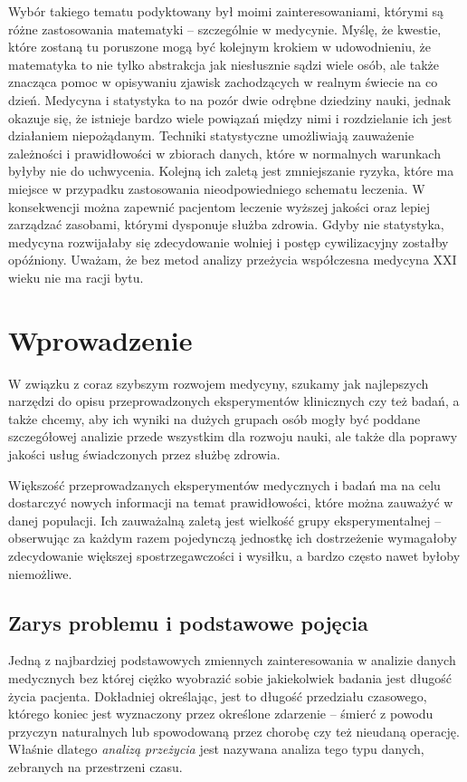 \documentclass[licencjacka]{pwr_wmat_praca_dyplomowa}
\theoremstyle{plain}
\numberwithin{theorem}{chapter}
\theoremstyle{definition}
\numberwithin{theorem}{chapter}
\begin{document}
Wybór takiego tematu podyktowany był moimi zainteresowaniami, którymi są różne zastosowania matematyki -- szczególnie w medycynie. Myślę, że kwestie, które zostaną tu poruszone mogą być kolejnym krokiem w udowodnieniu, że matematyka to nie tylko abstrakcja jak niesłusznie sądzi wiele osób, ale także znacząca pomoc w opisywaniu zjawisk zachodzących w realnym świecie na co dzień. Medycyna i statystyka to na pozór dwie odrębne dziedziny nauki, jednak okazuje się, że istnieje bardzo wiele powiązań między nimi i rozdzielanie ich jest działaniem niepożądanym. Techniki statystyczne umożliwiają zauważenie zależności i prawidłowości w zbiorach danych, które w normalnych warunkach byłyby nie do uchwycenia. Kolejną ich zaletą jest zmniejszanie ryzyka, które ma miejsce w przypadku zastosowania nieodpowiedniego schematu leczenia. W konsekwencji można zapewnić pacjentom leczenie wyższej jakości oraz lepiej zarządzać zasobami, którymi dysponuje służba zdrowia. Gdyby nie statystyka, medycyna rozwijałaby się zdecydowanie wolniej i postęp cywilizacyjny zostałby opóźniony. Uważam, że bez metod analizy przeżycia współczesna medycyna XXI wieku nie ma racji bytu.



\chapter{Wprowadzenie} 


W związku z coraz szybszym rozwojem medycyny, szukamy jak najlepszych narzędzi do opisu przeprowadzonych eksperymentów klinicznych czy też badań, a także chcemy, aby ich wyniki na dużych grupach osób mogły być poddane szczegółowej analizie przede wszystkim dla rozwoju nauki, ale także dla poprawy jakości usług świadczonych przez służbę zdrowia. 

Większość przeprowadzanych eksperymentów medycznych i badań ma na celu dostarczyć nowych informacji na temat  prawidłowości, które można zauważyć w danej populacji. Ich zauważalną zaletą jest wielkość grupy eksperymentalnej -- obserwując za każdym razem pojedynczą jednostkę ich dostrzeżenie wymagałoby zdecydowanie większej spostrzegawczości i wysiłku, a bardzo często nawet byłoby niemożliwe. 

\section{Zarys problemu i podstawowe pojęcia}

Jedną z najbardziej podstawowych zmiennych zainteresowania w analizie danych medycznych bez której ciężko wyobrazić sobie jakiekolwiek badania jest długość życia pacjenta. Dokładniej określając, jest to długość przedziału czasowego, którego koniec jest wyznaczony przez określone zdarzenie -- śmierć z powodu przyczyn naturalnych lub spowodowaną przez chorobę czy też nieudaną operację. Właśnie dlatego \textit{analizą przeżycia} jest nazywana analiza tego typu danych, zebranych na przestrzeni czasu.
\end{document}
